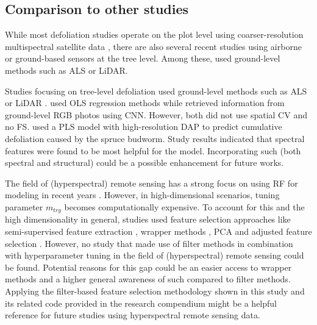 \documentclass[final]{IEEEtran}
\begin{document}
\subsection{Comparison to other studies}

While most defoliation studies operate on the plot level using coarser-resolution multispectral satellite data \cite{townsend2012, debeurs2008, rengarajan2016}, there are also several recent studies using airborne or ground-based sensors at the tree level.
Among these, \cite{meng2018, kalin2019} used ground-level methods such as \ac{ALS} or \ac{LiDAR}.

Studies focusing on tree-level defoliation used ground-level methods such as \ac{ALS} or \ac{LiDAR} \cite{meng2018, kalin2019}.
\cite{meng2018} used \ac{OLS} regression methods while \cite{kalin2019} retrieved information from ground-level RGB photos using \ac{CNN}.
However, both did not use spatial \ac{CV} and \cite{kalin2019} no \ac{FS}.
\cite{goodbody2018} used a \ac{PLS} model with high-resolution \ac{DAP} to predict cumulative defoliation caused by the spruce budworm.
Study results indicated that spectral features were found to be most helpful for the model.
Incorporating such (both spectral and structural) could be a possible enhancement for future works.

The field of (hyperspectral) remote sensing has a strong focus on using RF for modeling in recent years \cite{belgiu2016}.
However, in high-dimensional scenarios, tuning parameter \texttt{\(m_{try}\)} becomes computationally expensive.
To account for this and the high dimensionality in general, studies used feature selection approaches like semi-supervised feature extraction \cite{xia2015}, wrapper methods \cite{fassnacht2014a, feng2016, georganos2018}, PCA and adjusted feature selection \cite{rochac2016}.
However, no study that made use of filter methods in combination with hyperparameter tuning in the field of (hyperspectral) remote sensing could be found.
Potential reasons for this gap could be an easier access to wrapper methods and a higher general awareness of such compared to filter methods.
Applying the filter-based feature selection methodology shown in this study and its related code provided in the research compendium might be a helpful reference for future studies using hyperspectral remote sensing data.
\end{document}
